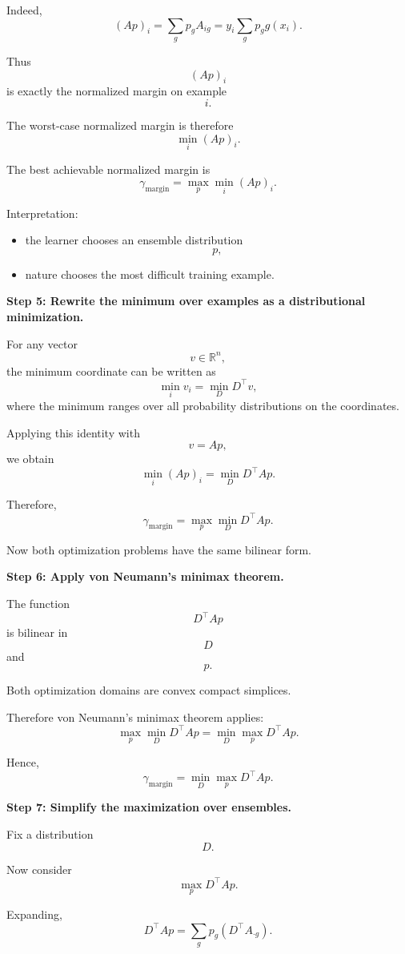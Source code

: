 \documentclass[11pt]{article}
\newcommand{\R}{\mathbb{R}}
\begin{document}
\begin{enumerate}
\begin{solutionbox}
Indeed,
\[
(Ap)_i
=
\sum_gp_gA_{ig}
=
y_i
\sum_gp_gg(x_i).
\]

Thus
\[
(Ap)_i
\]
is exactly the normalized margin on example
\[
i.
\]

The worst-case normalized margin is therefore
\[
\min_i(Ap)_i.
\]

The best achievable normalized margin is
\[
\boxed{
\gamma_{\mathrm{margin}}
=
\max_p
\min_i(Ap)_i.
}
\]

Interpretation:
\begin{itemize}
    \item the learner chooses an ensemble distribution
    \[
    p,
    \]
    \item nature chooses the most difficult training example.
\end{itemize}

\medskip

\textbf{Step 5: Rewrite the minimum over examples as a distributional minimization.}

For any vector
\[
v\in\R^n,
\]
the minimum coordinate can be written as
\[
\min_iv_i
=
\min_DD^\top v,
\]
where the minimum ranges over all probability distributions on the coordinates.

Applying this identity with
\[
v=Ap,
\]
we obtain
\[
\min_i(Ap)_i
=
\min_DD^\top Ap.
\]

Therefore,
\[
\boxed{
\gamma_{\mathrm{margin}}
=
\max_p
\min_D
D^\top Ap.
}
\]

Now both optimization problems have the same bilinear form.

\medskip

\textbf{Step 6: Apply von Neumann's minimax theorem.}

The function
\[
D^\top Ap
\]
is bilinear in
\[
D
\]
and
\[
p.
\]

Both optimization domains are convex compact simplices.

Therefore von Neumann's minimax theorem applies:
\[
\max_p
\min_D
D^\top Ap
=
\min_D
\max_p
D^\top Ap.
\]

Hence,
\[
\gamma_{\mathrm{margin}}
=
\min_D
\max_p
D^\top Ap.
\]

\medskip

\textbf{Step 7: Simplify the maximization over ensembles.}

Fix a distribution
\[
D.
\]

Now consider
\[
\max_pD^\top Ap.
\]

Expanding,
\[
D^\top Ap
=
\sum_gp_g(D^\top A_{\cdot g}).
\]


\end{solutionbox}
\end{enumerate}
\end{document}
